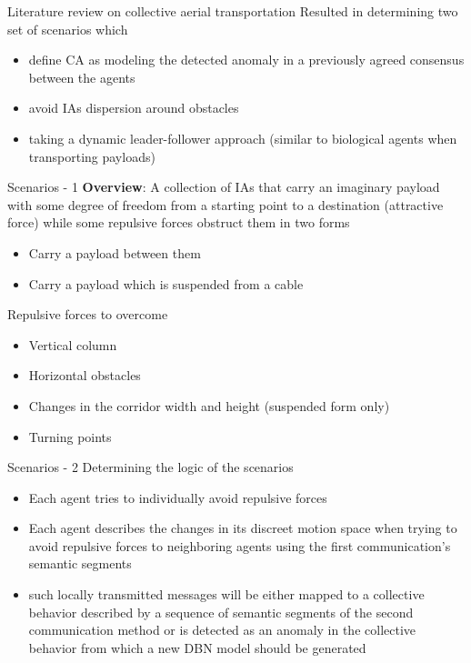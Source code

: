 \documentclass[unknownkeysallowed]{beamer}
\begin{document}
	\begin{frame}{Literature review on collective aerial transportation}
		Resulted in determining two set of scenarios which
		\begin{itemize}
			\item define CA as modeling the detected anomaly in a previously agreed consensus between the agents
			\item avoid IAs dispersion around obstacles
			\item taking a dynamic leader-follower approach (similar to biological agents when transporting payloads)
		\end{itemize}
	\end{frame}

	\begin{frame}{Scenarios - 1}
		\textbf{Overview}: A collection of IAs that carry an imaginary payload with some degree of freedom from a starting point to a destination (attractive force) while some repulsive forces obstruct them in two forms
		\begin{itemize}
			\item Carry a payload between them
			\item Carry a payload which is suspended from a cable
		\end{itemize}
		Repulsive forces to overcome
		\begin{itemize}
			\item Vertical column
			\item Horizontal obstacles
			\item Changes in the corridor width and height (suspended form only)
			\item Turning points
		\end{itemize}
	\end{frame}

	\begin{frame}{Scenarios - 2}
		Determining the logic of the scenarios
		\begin{itemize}
			\item Each agent tries to individually avoid repulsive forces 
			\item Each agent describes the changes in its discreet motion space when trying to avoid repulsive forces to neighboring agents using the first communication's semantic segments
			\item such locally transmitted messages will be either mapped to a collective behavior described by a sequence of semantic segments of the second communication method or is detected as an anomaly in the collective behavior from which a new DBN model should be generated
		\end{itemize}
	\end{frame}
\end{document}
